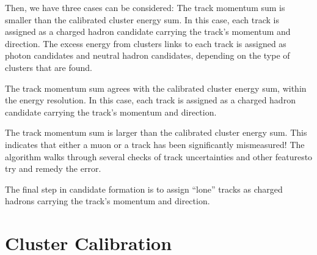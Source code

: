 Then, we have three cases can be considered: The track momentum sum is smaller than the calibrated cluster energy sum. In this case, each track is assigned as a charged hadron candidate carrying the track’s momentum and direction. The excess energy from clusters links to each track is assigned as photon candidates and neutral hadron candidates, depending on the type of clusters that are found.

The track momentum sum agrees with the calibrated cluster energy sum, within the energy resolution.  In this case, each track is assigned as a charged hadron candidate carrying the track’s momentum and direction.

The track momentum sum is larger than the calibrated cluster energy sum. This indicates that either a muon or a track has been significantly mismeasured! The algorithm walks through several checks of track uncertainties and other featuresto try and remedy the error.

The final step in candidate formation is to assign “lone” tracks as charged hadrons carrying the track’s momentum and direction.

\section{Cluster Calibration}


